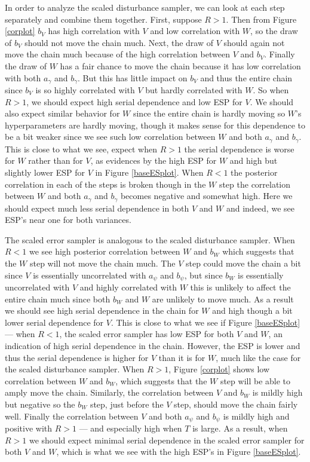 \documentclass{article}
\begin{document}
In order to analyze the scaled disturbance sampler, we can look at each step separately and combine them together. First, suppose $R>1$. Then from Figure \ref{corplot} $b_V$ has high correlation with $V$ and low correlation with $W$, so the draw of $b_V$ should not move the chain much. Next, the draw of $V$ should again not move the chain much because of the high correlation between $V$ and $b_V$. Finally the draw of $W$ has a fair chance to move the chain because it has low correlation with both $a_\gamma$ and $b_\gamma$. But this has little impact on $b_V$ and thus the entire chain since $b_V$ is so highly correlated with $V$ but hardly correlated with $W$. So when $R>1$, we should expect high serial dependence and low ESP for $V$. We should also expect similar behavior for $W$ since the entire chain is hardly moving so $W$'s hyperparameters are hardly moving, though it makes sense for this dependence to be a bit weaker since we see such low correlation between $W$ and both $a_\gamma$ and $b_\gamma$. This is close to what we see, expect when $R>1$ the serial dependence is worse for $W$ rather than for $V$, as evidences by the high ESP for $W$ and high but slightly lower ESP for $V$ in Figure \ref{baseESplot}. When $R<1$ the posterior correlation in each of the steps is broken though in the $W$ step the correlation between $W$ and both $a_\gamma$ and $b_\gamma$ becomes negative and somewhat high. Here we should expect much less serial dependence in both $V$ and $W$ and indeed, we see ESP's near one for both variances.

The scaled error sampler is analogous to the scaled disturbance sampler. When $R<1$ we see high posterior correlation between $W$ and $b_W$ which suggests that the $W$ step will not move the chain much. The $V$ step could move the chain a bit since $V$ is essentially uncorrelated with $a_\psi$ and $b_\psi$, but since $b_W$ is essentially uncorrelated with $V$ and highly correlated with $W$ this is unlikely to affect the entire chain much since both $b_W$ and $W$ are unlikely to move much. As a result we should see high serial dependence in the chain for $W$ and high though a bit lower serial dependence for $V$. This is close to what we see if Figure \ref{baseESplot} --- when $R<1$, the scaled error sampler has low ESP for both $V$ and $W$, an indication of high serial dependence in the chain. However, the ESP is lower and thus the serial dependence is higher for $V$ than it is for $W$, much like the case for the scaled disturbance sampler. When $R>1$, Figure \ref{corplot} shows low correlation between $W$ and $b_W$, which suggests that the $W$ step will be able to amply move the chain. Similarly, the correlation between $V$ and $b_W$ is mildly high but negative so the $b_W$ step, just before the $V$ step, should move the chain fairly well. Finally the correlation between $V$ and both $a_\psi$ and $b_\psi$ is mildly high and positive with $R>1$ --- and especially high when $T$ is large. As a result, when $R>1$ we should expect minimal serial dependence in the scaled error sampler for both $V$ and $W$, which is what we see with the high ESP's in Figure \ref{baseESplot}.
\end{document}
